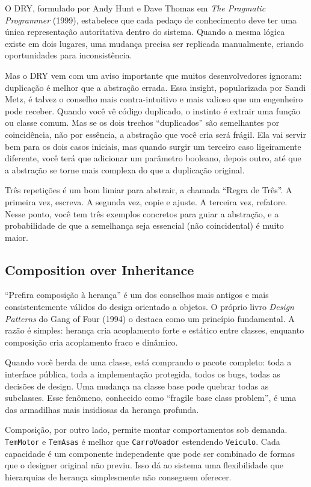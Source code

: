 O DRY, formulado por Andy Hunt e Dave Thomas em \emph{The Pragmatic Programmer}
(1999), estabelece que cada pedaço de conhecimento deve ter uma única representação
autoritativa dentro do sistema. Quando a mesma lógica existe em dois lugares, uma
mudança precisa ser replicada manualmente, criando oportunidades para inconsistência.

Mas o DRY vem com um aviso importante que muitos desenvolvedores ignoram:
duplicação é melhor que a abstração errada. Essa insight, popularizada por
Sandi Metz, é talvez o conselho mais contra-intuitivo e mais valioso que um
engenheiro pode receber. Quando você vê código duplicado, o instinto é
extrair uma função ou classe comum. Mas se os dois trechos ``duplicados''
são semelhantes por coincidência, não por essência, a abstração que você
cria será frágil. Ela vai servir bem para os dois casos iniciais, mas quando
surgir um terceiro caso ligeiramente diferente, você terá que adicionar um
parâmetro booleano, depois outro, até que a abstração se torne mais complexa
do que a duplicação original.

Três repetições é um bom limiar para abstrair, a chamada ``Regra de Três''.
A primeira vez, escreva. A segunda vez, copie e ajuste. A terceira vez,
refatore. Nesse ponto, você tem três exemplos concretos para guiar a
abstração, e a probabilidade de que a semelhança seja essencial (não
coincidental) é muito maior.

\subsection{Composition over Inheritance}

``Prefira composição à herança'' é um dos conselhos mais antigos e mais
consistentemente válidos do design orientado a objetos. O próprio livro
\emph{Design Patterns} do Gang of Four (1994) o destaca como um princípio
fundamental. A razão é simples: herança cria acoplamento forte e estático
entre classes, enquanto composição cria acoplamento fraco e dinâmico.

Quando você herda de uma classe, está comprando o pacote completo: toda a
interface pública, toda a implementação protegida, todos os bugs, todas as
decisões de design. Uma mudança na classe base pode quebrar todas as subclasses.
Esse fenômeno, conhecido como ``fragile base class problem'', é uma das
armadilhas mais insidiosas da herança profunda.

Composição, por outro lado, permite montar comportamentos sob demanda.
\texttt{TemMotor} e \texttt{TemAsas} é melhor que \texttt{CarroVoador}
estendendo \texttt{Veiculo}. Cada capacidade é um componente independente que
pode ser combinado de formas que o designer original não previu. Isso dá ao
sistema uma flexibilidade que hierarquias de herança simplesmente não conseguem
oferecer.

